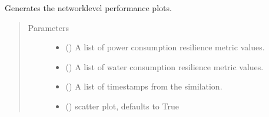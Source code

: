 \documentclass[letterpaper,10pt,english]{sphinxmanual}
\begin{document}

\begin{fulllineitems}
\label{\detokenize{apidoc:dreaminsg_integrated_model.src.plots.plot_interdependent_effects}}
\sphinxAtStartPar
Generates the network\sphinxhyphen{}level performance plots.
\begin{quote}\begin{description}
\item[{Parameters}] \leavevmode\begin{itemize}
\item {} 
\sphinxAtStartPar
{} () \textendash{} A list of power consumption resilience metric values.

\item {} 
\sphinxAtStartPar
{} () \textendash{} A list of water consumption resilience metric values.

\item {} 
\sphinxAtStartPar
{} () \textendash{} A list of time\sphinxhyphen{}stamps from the similation.

\item {} 
\sphinxAtStartPar
{} (\sphinxstyleliteralemphasis{\sphinxupquote{, }}) \textendash{} scatter plot, defaults to True

\end{itemize}

\end{description}\end{quote}

\end{fulllineitems}
\end{document}
